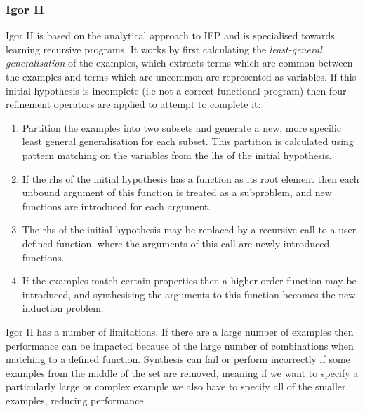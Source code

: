 \subsubsection{Igor II}
Igor II \cite{Kitzelmann2006} is based on the analytical approach to IFP and is specialised towards learning recursive programs. It works by first calculating the \textit{least-general generalisation} of the examples, which extracts terms which are common between the examples and terms which are uncommon are represented as variables. If this initial hypothesis is incomplete (i.e not a correct functional program) then four refinement operators are applied to attempt to complete it:
\begin{enumerate}
\item Partition the examples into two subsets and generate a new, more specific least general generalisation for each subset. This partition is calculated using pattern matching on the variables from the lhs of the initial hypothesis.
\item If the rhs of the initial hypothesis has a function as its root element then each unbound argument of this function is treated as a subproblem, and new functions are introduced for each argument.
\item The rhs of the initial hypothesis may be replaced by a recursive call to a user-defined function, where the arguments of this call are newly introduced functions.
\item If the examples match certain properties then a higher order function may be introduced, and synthesising the arguments to this function becomes the new induction problem.
\end{enumerate}
Igor II has a number of limitations. If there are a large number of examples then performance can be impacted because of the large number of combinations when matching to a defined function. Synthesis can fail or perform incorrectly if some examples from the middle of the set are removed, meaning if we want to specify a particularly large or complex example we also have to specify all of the smaller examples, reducing performance.

